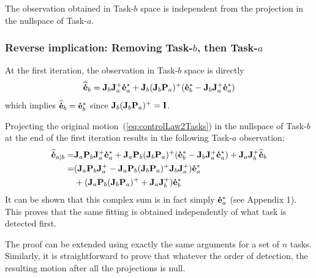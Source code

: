 \documentclass[letterpaper, 10pt, conference]{ieeeconf}      %
\begin{document}
The observation obtained in Task-$b$ space is independent from the
projection in the nullspace of Task-$a$.

\subsubsection{Reverse implication: Removing Task-$b$, then Task-$a$}

At the first iteration, the observation in Task-$b$ space is directly
\begin{equation*}
{\mathbf{\widehat{\dot{e}}}}_{b}  = {\mathbf{J}}_{b} {\mathbf{J}}_{a}^+ {\mathbf{\dot{e}}}_{a}^* + {\mathbf{J}}_{b} ( {\mathbf{J}}_{b} {\mathbf{P}}_{a} )^+ ( {\mathbf{\dot{e}}}_{b}^* - {\mathbf{J}}_{b} {\mathbf{J}}_{a}^+ {\mathbf{\dot{e}}}_{a}^* )
\end{equation*}
which implies ${\mathbf{\widehat{\dot{e}}}}_{b} = {\mathbf{\dot{e}}}_{b}^*$ since ${\mathbf{J}}_{b} ( {\mathbf{J}}_{b} {\mathbf{P}}_{a} )^+ = {\mathbf{I}}$.

Projecting the original motion~(\ref{eq:controlLaw2Tasks}) in the nullspace of Task-$b$ at the
end of the first iteration results in the following Task-$a$ observation:
\begin{align*}
{\mathbf{\widehat{\dot{e}}}}_{a|b} =& {\mathbf{J}}_{a} {\mathbf{P}}_{b} {\mathbf{J}}_{a}^+ {\mathbf{\dot{e}}}_{a}^* +
 {\mathbf{J}}_{a} {\mathbf{P}}_{b} ({\mathbf{J}}_{b} {\mathbf{P}}_{a} )^+ ( {\mathbf{\dot{e}}}_{b}^* - {\mathbf{J}}_{b} {\mathbf{J}}_{a}^+ {\mathbf{\dot{e}}}_{a}^*)
+ {\mathbf{J}}_{a} {\mathbf{J}}_{b}^+ {\mathbf{\widehat{\dot{e}}}}_{b} \\
=& ({\mathbf{J}}_{a} {\mathbf{P}}_{b} {\mathbf{J}}_{a}^+ - {\mathbf{J}}_{a} {\mathbf{P}}_{b} ({\mathbf{J}}_{b} {\mathbf{P}}_{a} )^+ {\mathbf{J}}_{b} {\mathbf{J}}_{a}^+) {\mathbf{\dot{e}}}_{a}^* \\
&+ ({\mathbf{J}}_{a} {\mathbf{P}}_{b} ({\mathbf{J}}_{b} {\mathbf{P}}_{a} )^+ + {\mathbf{J}}_{a} {\mathbf{J}}_{b}^+) {\mathbf{\dot{e}}}_{b}^*
\end{align*}
It can be shown that this complex sum is in fact simply ${\mathbf{\dot{e}}}_{a}^*$ (see Appendix 1).
%
This proves that the same fitting is obtained independently of what task is
detected first.  \QED

\medskip
 The proof can be extended using exactly the same arguments for
a set of $n$ tasks.
Similarly, it is straightforward to prove that whatever the order of detection, 
the resulting motion after all the projections is null.
\end{document}
